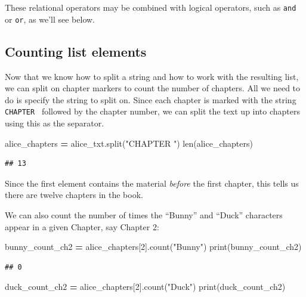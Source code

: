 \documentclass[]{book}
\newenvironment{Shaded}{\begin{snugshade}}{\end{snugshade}}
\newcommand{\BuiltInTok}[1]{#1}
\newcommand{\DecValTok}[1]{\textcolor[rgb]{0.00,0.00,0.81}{#1}}
\newcommand{\NormalTok}[1]{#1}
\newcommand{\OperatorTok}[1]{\textcolor[rgb]{0.81,0.36,0.00}{\textbf{#1}}}
\newcommand{\StringTok}[1]{\textcolor[rgb]{0.31,0.60,0.02}{#1}}
\begin{document}
These relational operators may be combined with logical operators, such as \texttt{and} or \texttt{or}, as we'll see below.

\hypertarget{counting-list-elements}{%
\subsection{Counting list elements}\label{counting-list-elements}}

Now that we know how to split a string and how to work with the resulting list, we can split on chapter markers to count the number of chapters. All we need to do is specify the string to split on. Since each chapter is marked with the string \texttt{\textquotesingle{}CHAPTER\ \textquotesingle{}} followed by the chapter number, we can split the text up into chapters using this as the separator.

\begin{Shaded}
\begin{Highlighting}[]
\NormalTok{alice_chapters }\OperatorTok{=}\NormalTok{ alice_txt.split(}\StringTok{"CHAPTER "}\NormalTok{)}
\BuiltInTok{len}\NormalTok{(alice_chapters)}
\end{Highlighting}
\end{Shaded}

\begin{verbatim}
## 13
\end{verbatim}

Since the first element contains the material \emph{before} the first chapter, this tells us there are twelve chapters in the book.

We can also count the number of times the ``Bunny'' and ``Duck'' characters appear in a given Chapter, say Chapter 2:

\begin{Shaded}
\begin{Highlighting}[]
\NormalTok{bunny_count_ch2 }\OperatorTok{=}\NormalTok{ alice_chapters[}\DecValTok{2}\NormalTok{].count(}\StringTok{"Bunny"}\NormalTok{)}
\BuiltInTok{print}\NormalTok{(bunny_count_ch2)}
\end{Highlighting}
\end{Shaded}

\begin{verbatim}
## 0
\end{verbatim}

\begin{Shaded}
\begin{Highlighting}[]
\NormalTok{duck_count_ch2 }\OperatorTok{=}\NormalTok{ alice_chapters[}\DecValTok{2}\NormalTok{].count(}\StringTok{"Duck"}\NormalTok{)}
\BuiltInTok{print}\NormalTok{(duck_count_ch2)}
\end{Highlighting}
\end{Shaded}
\end{document}

